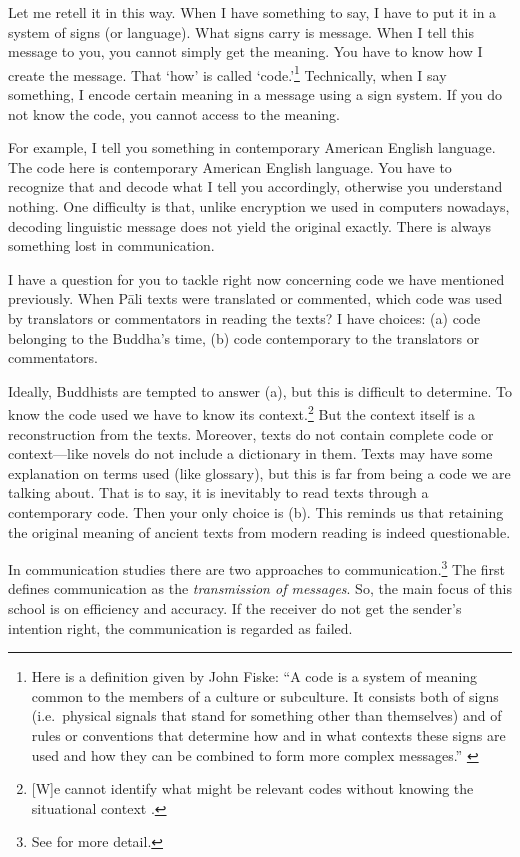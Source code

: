 Let me retell it in this way. When I have something to say, I have to put it in a system of signs (or language). What signs carry is message. When I tell this message to you, you cannot simply get the meaning. You have to know how I create the message. That `how' is called `code.'\footnote{Here is a definition given by John Fiske: ``A code is a system of meaning common to the members of a culture or subculture. It consists both of signs (i.e.\ physical signals that stand for something other than themselves) and of rules or conventions that determine how and in what contexts these signs are used and how they can be combined to form more complex messages.'' \citep[pp.~19--20]{fiske:communication}} Technically, when I say something, I encode certain meaning in a message using a sign system. If you do not know the code, you cannot access to the meaning. 

For example, I tell you something in contemporary American English language. The code here is contemporary American English language. You have to recognize that and decode what I tell you accordingly, otherwise you understand nothing. One difficulty is that, unlike encryption we used in computers nowadays, decoding linguistic message does not yield the original exactly. There is always something lost in communication. 

I have a question for you to tackle right now concerning code we have mentioned previously. When P\=ali texts were translated or commented, which code was used by translators or commentators in reading the texts? I have choices: (a) code belonging to the Buddha's time, (b) code contemporary to the translators or commentators. 

Ideally, Buddhists are tempted to answer (a), but this is difficult to determine. To know the code used we have to know its context.\footnote{[W]e cannot identify what might be relevant codes without knowing the situational context \citep[p.~236]{chandler:semiotics}.} But the context itself is a reconstruction from the texts. Moreover, texts do not contain complete code or context---like novels do not include a dictionary in them. Texts may have some explanation on terms used (like glossary), but this is far from being a code we are talking about. That is to say, it is inevitably to read texts through a contemporary code. Then your only choice is (b). This reminds us that retaining the original meaning of ancient texts from modern reading is indeed questionable.

In communication studies there are two approaches to communication.\footnote{See \citealp[pp.~2--4]{fiske:communication} for more detail.} The first defines communication as the \emph{transmission of messages}. So, the main focus of this school is on efficiency and accuracy. If the receiver do not get the sender's intention right, the communication is regarded as failed.

